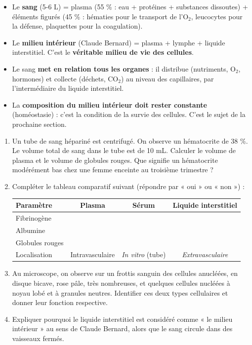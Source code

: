 \documentclass[11pt]{article}
\begin{document}
\begin{aretenir}
\begin{itemize}
    \item Le \textbf{sang} (5-6 L) = plasma (55 \% : eau + protéines + substances dissoutes) + éléments figurés (45 \% : hématies pour le transport de l'O$_2$, leucocytes pour la défense, plaquettes pour la coagulation).
    \item Le \textbf{milieu intérieur} (Claude Bernard) = plasma + lymphe + liquide interstitiel. C'est le \textbf{véritable milieu de vie des cellules}.
    \item Le sang \textbf{met en relation tous les organes} : il distribue (nutriments, O$_2$, hormones) et collecte (déchets, CO$_2$) au niveau des capillaires, par l'intermédiaire du liquide interstitiel.
    \item La \textbf{composition du milieu intérieur doit rester constante} (homéostasie) : c'est la condition de la survie des cellules. C'est le sujet de la prochaine section.
\end{itemize}
\end{aretenir}

\begin{exercice}
\begin{enumerate}
    \item Un tube de sang hépariné est centrifugé. On observe un hématocrite de 38 \%. Le volume total de sang dans le tube est de 10 mL. Calculer le volume de plasma et le volume de globules rouges. Que signifie un hématocrite modérément bas chez une femme enceinte au troisième trimestre ?
    \item Compléter le tableau comparatif suivant (répondre par « oui » ou « non ») :
    \begin{center}
    \begin{tabular}{|l|c|c|c|}\hline
    \rowcolor{popblueL}
    \textbf{Paramètre} & \textbf{Plasma} & \textbf{Sérum} & \textbf{Liquide interstitiel} \\ \hline
    Fibrinogène & & & \\ \hline
    Albumine & & & \\ \hline
    Globules rouges & & & \\ \hline
    Localisation & Intravasculaire & \textit{In vitro} (tube) & \textit{Extravasculaire} \\ \hline
    \end{tabular}
    \end{center}
    \item Au microscope, on observe sur un frottis sanguin des cellules anucléées, en disque bicave, rose pâle, très nombreuses, et quelques cellules nucléées à noyau lobé et à granules neutres. Identifier ces deux types cellulaires et donner leur fonction respective.
    \item Expliquer pourquoi le liquide interstitiel est considéré comme « le milieu intérieur » au sens de Claude Bernard, alors que le sang circule dans des vaisseaux fermés.
\end{enumerate}
\end{exercice}
\end{document}
